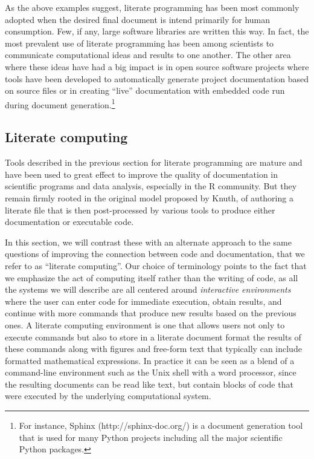 \documentclass[ChapterTOCs,krantz2]{krantz} %
\theoremstyle{definition}
\begin{document}
As the above examples suggest, literate programming has been most commonly
adopted when the desired final document is intend primarily for human
consumption.  Few, if any, large software libraries are written this way.
In fact, the most prevalent use of literate programming has been among
scientists to communicate computational ideas and results to one another.
The other area where these ideas have had a big impact is in open source
software projects where tools have been developed to automatically generate
project documentation based on source files or in creating ``live''
documentation with embedded code run during document generation.\footnote{
For instance, Sphinx (http://sphinx-doc.org/) is a document generation tool
that is used for many Python projects including all the major scientific
Python packages.} 

\subsection{Literate computing}

Tools described in the previous section for literate programming are mature and
have been used to great effect to improve the quality of documentation in
scientific programs and data analysis, especially in the R community.  But they
remain firmly rooted in the original model proposed by Knuth, of authoring a
literate file that is then post-processed by various tools to produce either
documentation or executable code.  

In this section, we will contrast these with an alternate approach to the same
questions of improving the connection between code and documentation, that we
refer to as ``literate computing''.  Our choice of terminology points to the
fact that we emphasize the act of computing itself rather than the writing of
code, as all the systems we will describe are all centered around
\emph{interactive environments} where the user can enter code for immediate
execution, obtain results, and continue with more commands that produce new
results based on the previous ones.  A literate computing environment is one
that allows users not only to execute commands but also to store in a literate
document format the results of these commands along with figures and free-form
text that typically can include formatted mathematical expressions.  In
practice it can be seen as a blend of a command-line environment such as the
Unix shell with a word processor, since the resulting documents can be read
like text, but contain blocks of code that were executed by the underlying
computational system.
\end{document}
